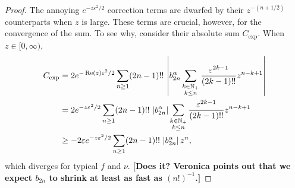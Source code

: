 \documentclass[11pt,a4paper,twoside,leqno,noamsfonts]{amsart}
\numberwithin{equation}{section}
\begin{document}
\begin{proof}
The annoying $e^{-z\varepsilon^2/2}$ correction terms are dwarfed by their $z^{-(n+1/2)}$ counterparts when $z$ is large. These terms are crucial, however, for the convergence of the sum. To see why, consider their absolute sum $C_\text{exp}$. When $z \in [0, \infty)$,
\begin{align*}
C_\text{exp} & = 2e^{-\operatorname{Re}(z)\varepsilon^2/2} \sum_{n \ge 1} (2n-1)!!\,\left| b_{2n}^\alpha \sum_{\substack{k \in \mathbb N_+ \\ k \le n}} \frac{\varepsilon^{2k-1}}{(2k-1)!!} z^{n-k+1} \right| \\
& = 2e^{-z\varepsilon^2/2} \sum_{n \ge 1} (2n-1)!!\,\left|b_{2n}^\alpha\right| \sum_{\substack{k \in \mathbb N_+ \\ k \le n}} \frac{\varepsilon^{2k-1}}{(2k-1)!!} z^{n-k+1} \\
& \ge -2\varepsilon e^{-z\varepsilon^2/2} \sum_{n \ge 1} (2n-1)!!\,\left|b_{2n}^\alpha\right| z^n,
\end{align*}
which diverges for typical $f$ and $\nu$. \textbf{[Does it? Veronica points out that we expect $b_{2n}$ to shrink at least as fast as $(n!)^{-1}$.]}


\end{proof}
\end{document}
